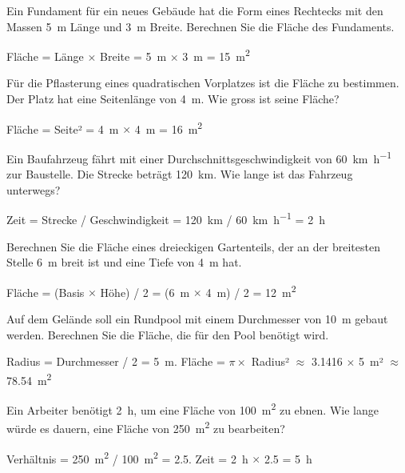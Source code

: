 \begin{questions}
    \question Ein Fundament für ein neues Gebäude hat die Form eines Rechtecks mit den Massen \SI{5}{\metre} Länge und \SI{3}{\metre} Breite. Berechnen Sie die Fläche des Fundaments.
    \begin{solution}
    Fläche = Länge $\times$ Breite = \SI{5}{\metre} $\times$ \SI{3}{\metre} = \SI{15}{\square\metre}
    \end{solution}

    \question Für die Pflasterung eines quadratischen Vorplatzes ist die Fläche zu bestimmen. Der Platz hat eine Seitenlänge von \SI{4}{\metre}. Wie gross ist seine Fläche?
    \begin{solution}
    Fläche = Seite² = \SI{4}{\metre} $\times$ \SI{4}{\metre} = \SI{16}{\square\metre}
    \end{solution}

    \question Ein Baufahrzeug fährt mit einer Durchschnittsgeschwindigkeit von \SI{60}{\kilo\metre\per\hour} zur Baustelle. Die Strecke beträgt \SI{120}{\kilo\metre}. Wie lange ist das Fahrzeug unterwegs?
    \begin{solution}
    Zeit = Strecke / Geschwindigkeit = \SI{120}{\kilo\metre} / \SI{60}{\kilo\metre\per\hour} = \SI{2}{\hour}
    \end{solution}

    \question Berechnen Sie die Fläche eines dreieckigen Gartenteils, der an der breitesten Stelle \SI{6}{\metre} breit ist und eine Tiefe von \SI{4}{\metre} hat.
    \begin{solution}
    Fläche = (Basis $\times$ Höhe) / 2 = (\SI{6}{\metre} $\times$ \SI{4}{\metre}) / 2 = \SI{12}{\square\metre}
    \end{solution}

    \question Auf dem Gelände soll ein Rundpool mit einem Durchmesser von \SI{10}{\metre} gebaut werden. Berechnen Sie die Fläche, die für den Pool benötigt wird.
    \begin{solution}
    Radius = Durchmesser / 2 = \SI{5}{\metre}. Fläche = $\pi \times$ Radius² $\approx$ 3.1416 $\times$ \SI{5}{\metre}² $\approx$ \SI{78.54}{\square\metre}
    \end{solution}

    \question Ein Arbeiter benötigt \SI{2}{\hour}, um eine Fläche von \SI{100}{\square\metre} zu ebnen. Wie lange würde es dauern, eine Fläche von \SI{250}{\square\metre} zu bearbeiten?
    \begin{solution}
    Verhältnis = \SI{250}{\square\metre} / \SI{100}{\square\metre} = 2.5. Zeit = \SI{2}{\hour} $\times$ 2.5 = \SI{5}{\hour}
    \end{solution}


\end{questions}
